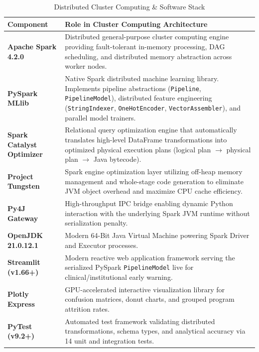 \documentclass[11pt,a4paper]{article}
\begin{document}
\begin{table}[H]
    \centering
    \caption{Distributed Cluster Computing \& Software Stack}
    \label{tab:tools_stack}
    \small
    \begin{tabularx}{\linewidth}{lX}
        \toprule
        \textbf{Component} & \textbf{Role in Cluster Computing Architecture} \\
        \midrule
        \textbf{Apache Spark 4.2.0} & Distributed general-purpose cluster computing engine providing fault-tolerant in-memory processing, DAG scheduling, and distributed memory abstraction across worker nodes. \\
        \addlinespace
        \textbf{PySpark MLlib} & Native Spark distributed machine learning library. Implements pipeline abstractions (\texttt{Pipeline}, \texttt{PipelineModel}), distributed feature engineering (\texttt{StringIndexer}, \texttt{OneHotEncoder}, \texttt{VectorAssembler}), and parallel model trainers. \\
        \addlinespace
        \textbf{Spark Catalyst Optimizer} & Relational query optimization engine that automatically translates high-level DataFrame transformations into optimized physical execution plans (logical plan $\to$ physical plan $\to$ Java bytecode). \\
        \addlinespace
        \textbf{Project Tungsten} & Spark engine optimization layer utilizing off-heap memory management and whole-stage code generation to eliminate JVM object overhead and maximize CPU cache efficiency. \\
        \addlinespace
        \textbf{Py4J Gateway} & High-throughput IPC bridge enabling dynamic Python interaction with the underlying Spark JVM runtime without serialization penalty. \\
        \addlinespace
        \textbf{OpenJDK 21.0.12.1} & Modern 64-Bit Java Virtual Machine powering Spark Driver and Executor processes. \\
        \addlinespace
        \textbf{Streamlit (v1.66+)} & Modern reactive web application framework serving the serialized PySpark \texttt{PipelineModel} live for clinical/institutional early warning. \\
        \addlinespace
        \textbf{Plotly Express} & GPU-accelerated interactive visualization library for confusion matrices, donut charts, and grouped program attrition rates. \\
        \addlinespace
        \textbf{PyTest (v9.2+)} & Automated test framework validating distributed transformations, schema types, and analytical accuracy via 14 unit and integration tests. \\
        \bottomrule
    \end{tabularx}
\end{table}
\end{document}
